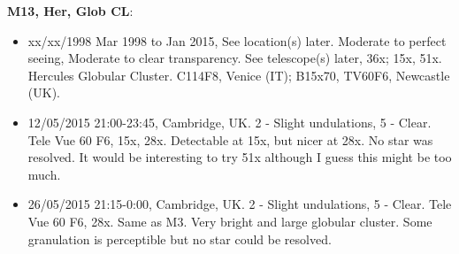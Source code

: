 {\bf M13, Her, Glob CL}:
\begin{itemize}
\item xx/xx/1998 Mar 1998 to Jan 2015, See location(s) later. Moderate to perfect seeing, Moderate to clear transparency. See telescope(s) later, 36x; 15x, 51x. Hercules Globular Cluster. C114F8, Venice (IT); B15x70, TV60F6, Newcastle (UK).
\item 12/05/2015 21:00-23:45, Cambridge, UK. 2 - Slight undulations, 5 - Clear. Tele Vue 60 F6, 15x, 28x. Detectable at 15x, but nicer at 28x. No star was resolved. It would be interesting to try 51x although I guess this might be too much. 
\item 26/05/2015 21:15-0:00, Cambridge, UK. 2 - Slight undulations, 5 - Clear. Tele Vue 60 F6, 28x. Same as M3. Very bright and large globular cluster. Some granulation is perceptible but no star could be resolved.
\end{itemize}
